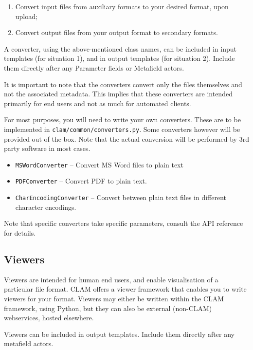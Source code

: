 \documentclass[a4paper,12pt]{report}
\begin{document}
\begin{enumerate}
\item Convert input files from auxiliary formats to your desired format, upon upload;
\item Convert output files from your output format to secondary formats.
\end{enumerate}

A converter, using the above-mentioned class names, can be included in input templates (for situation 1), and in output templates (for situation 2). Include them directly after any Parameter fields or Metafield actors.

It is important to note that the converters convert only the files themselves and not the associated metadata. This implies that these converters are intended primarily for end users and not as much for automated clients.

For most purposes, you will need to write your own converters. These are to be implemented in \texttt{clam/common/converters.py}. Some converters however will be provided out of the box. Note that the actual conversion will be performed by 3rd party software in most cases.

\begin{itemize}
\item \texttt{MSWordConverter} -- Convert MS Word files to plain text
\item \texttt{PDFConverter} -- Convert PDF to plain text.
\item \texttt{CharEncodingConverter} -- Convert between plain text files in different character encodings.
\end{itemize}

Note that specific converters take specific parameters, consult the API reference for details.


\subsection{Viewers}

Viewers are intended for human end users, and enable visualisation of a particular file format. CLAM offers a viewer framework that enables you to write viewers for your format. Viewers may either be written within the CLAM framework, using Python, but they can also be external (non-CLAM) webservices, hosted elsewhere.

Viewers can be included in output templates. Include them directly after any metafield actors.
\end{document}
